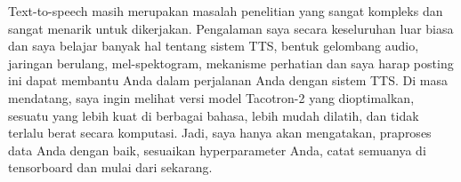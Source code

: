 Text-to-speech masih merupakan masalah penelitian yang sangat kompleks dan sangat menarik untuk dikerjakan. Pengalaman saya secara keseluruhan luar biasa dan saya belajar banyak hal tentang sistem TTS, bentuk gelombang audio, jaringan berulang, mel-spektogram, mekanisme perhatian dan saya harap posting ini dapat membantu Anda dalam perjalanan Anda dengan sistem TTS. Di masa mendatang, saya ingin melihat versi model Tacotron-2 yang dioptimalkan, sesuatu yang lebih kuat di berbagai bahasa, lebih mudah dilatih, dan tidak terlalu berat secara komputasi.
Jadi, saya hanya akan mengatakan, praproses data Anda dengan baik, sesuaikan hyperparameter Anda, catat semuanya di tensorboard dan mulai dari sekarang.